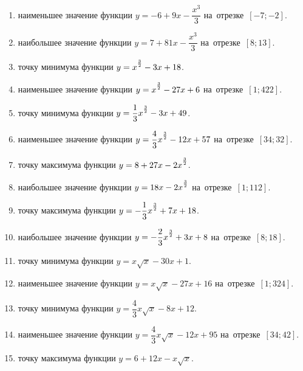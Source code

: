 \documentclass[a4paper,10pt]{article}
\begin{document}
\begin{enumerate}
\item {} наименьшее значение функции $y=-6 +9x-\dfrac{x^3}{3}$ на~отрезке~$\left[-7;-2\right]$.

\item {} наибольшее значение функции $y=7 +81x-\dfrac{x^3}{3}$ на~отрезке~$\left[8;13\right]$.

\item {} точку минимума функции $y=x\strut^{\frac{3}{2}} -3x+18$.

\item {} наименьшее значение функции $y=x\strut^{\frac{3}{2}} -27x+6$ на~отрезке~$\left[1;422\right]$.

\item {} точку минимума функции $y=\dfrac{1}{3}x\strut^{\frac{3}{2}} -3x+49$.

\item {} наименьшее значение функции $y=\dfrac{4}{3}x\strut^{\frac{3}{2}} -12x+57$ на~отрезке~$\left[34;32\right]$.

\item {} точку максимума функции $y=8+27x-2x\strut^{\frac{3}{2}}$.

\item {} наибольшее значение функции $y=18x-2x\strut^{\frac{3}{2}}$ на~отрезке~$\left[1;112\right]$.

\item {} точку максимума функции $y=-\dfrac{1}{3}x\strut^{\frac{3}{2}} +7x+18$.

\item {} наибольшее значение функции $y=-\dfrac{2}{3}x\strut^{\frac{3}{2}} +3x+8$ на~отрезке~$\left[8;18\right]$.

\item {} точку минимума функции $y=x\sqrt{x} -30x+1$.

\item {} наименьшее значение функции $y=x\sqrt{x} -27x+16$ на~отрезке~$\left[1;324\right]$.

\item {} точку минимума функции $y=\dfrac{4}{3}x\sqrt{x} -8x+12$.

\item {} наименьшее значение функции $y=\dfrac{4}{3}x\sqrt{x} -12x+95$ на~отрезке~$\left[34;42\right]$.

\item {} точку максимума функции $y=6+12x -x\sqrt{x}$.


\end{enumerate}
\end{document}
